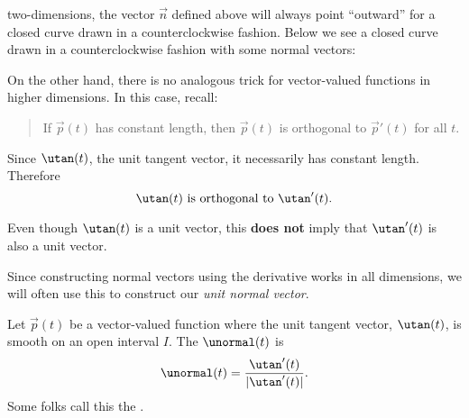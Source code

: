 \documentclass{ximera}
\begin{document}
two-dimensions, the vector $\vec{n}$ defined above will always point
``outward'' for a closed curve drawn in a counterclockwise
fashion. Below we see a closed curve drawn in a counterclockwise
fashion with some normal vectors:
\begin{image}
\end{image}
On the other hand, there is no analogous trick for vector-valued
functions in higher dimensions. In this case, recall:
\begin{quote}
If $\vec{p}(t)$ has constant length, then $\vec{p}(t)$ is orthogonal
to $\vec{p}'(t)$ for all $t$.
\end{quote}
Since $\utan(t)$, the unit tangent vector, it necessarily has
constant length. Therefore
\[
\utan(t)\text{ is orthogonal to }\utan'(t).
\]
\begin{warning}
  Even though $\utan(t)$ is a unit vector, this \textbf{does not}
  imply that $\utan'(t)$ is also a unit vector.
\end{warning}
Since constructing normal vectors using the derivative works in all
dimensions, we will often use this to construct our \textit{unit
  normal vector}.
\begin{definition}
Let $\vec{p}(t)$ be a vector-valued function where the unit tangent
vector, $\utan(t)$, is smooth on an open interval $I$. The
 $\unormal(t)$ is 
\[
\unormal(t) = \frac{\utan'(t)}{|\utan'(t)|}.
\]
Some folks call this the .
\end{definition}
\end{document}
